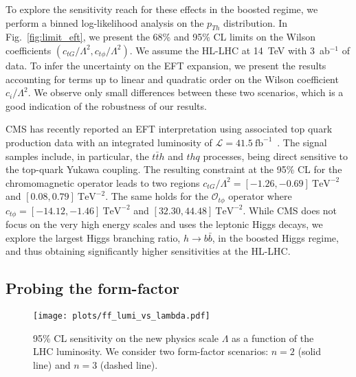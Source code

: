\documentclass[reprint, aps,prd, preprintnumbers,groupedaddress,nofootinbib]{revtex4-1}
\begin{document}
To explore the sensitivity reach for these effects in the boosted regime, we perform a binned log-likelihood analysis on the $p_{Th}$ distribution. In Fig.~\ref{fig:limit_eft}, we present the 68\% and 95\% CL limits on the Wilson coefficients $(c_{tG}/\Lambda^2,c_{t\phi}/\Lambda^2)$. We assume the HL-LHC at 14~TeV with 3~ab$^{-1}$ of data. To infer the uncertainty on the EFT expansion, we present the results accounting for terms up to linear and quadratic order on the Wilson coefficient  $c_i/\Lambda^2$. We observe only small differences between these two scenarios,  which is a good indication of the robustness of our results. 

CMS has recently reported an EFT interpretation using associated top quark production data with an integrated luminosity of $\mathcal{L}=41.5~\text{fb}^{-1}$~\cite{CMS-PAS-TOP-19-001}. The signal samples include, in  particular, the $t\bar{t}h$ and $thq$ processes, being direct sensitive to the top-quark Yukawa coupling. The resulting constraint at the 95\% CL for the chromomagnetic operator leads to two regions $c_{tG}/\Lambda^2=[-1.26, -0.69]~\text{TeV}^{-2}$ and $[0.08, 0.79]~\text{TeV}^{-2}$. The same holds for the $\mathcal{O}_{t\phi}$ operator where $c_{t\phi}=[-14.12, -1.46]~\text{TeV}^{-2}$ and $[32.30, 44.48]~\text{TeV}^{-2}$. While CMS does not focus on the very high energy scales and uses the leptonic Higgs decays, we explore the largest Higgs branching ratio, $h\to b\bar{b}$, in the boosted Higgs regime, and thus obtaining  significantly higher sensitivities at the HL-LHC.

\subsection{Probing the form-factor}
\label{sec:ReachFF}

\begin{figure}[t!]
    \centering
    \texttt{[image: plots/ff\_lumi\_vs\_lambda.pdf]}
    \caption{95\% CL sensitivity on the new physics scale $\Lambda$ as a function of the LHC luminosity. We consider two form-factor scenarios: $n=2$ (solid line) and $n=3$ (dashed line).}
    \label{fig:limit_ff}
\end{figure}
\end{document}
